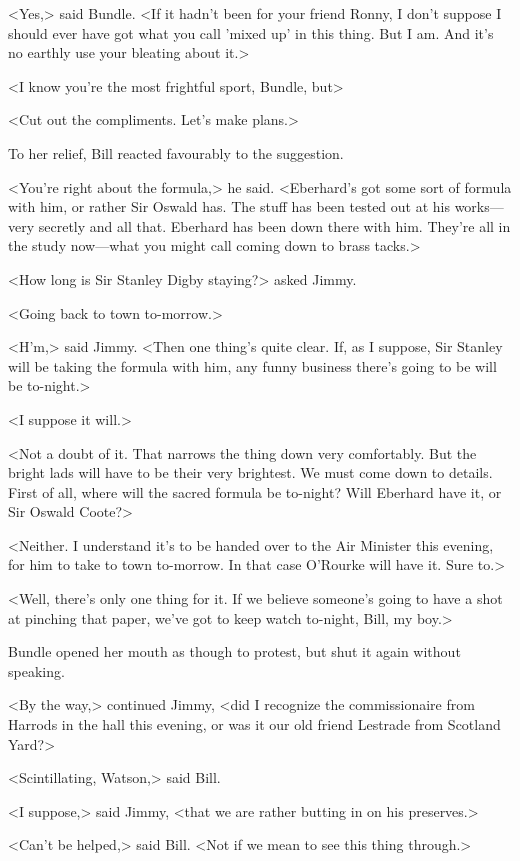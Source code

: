 <Yes,> said Bundle. <If it hadn't been for your friend Ronny, I don't suppose I should ever have got what you call 'mixed up' in this thing. But I am. And it's no earthly use your bleating about it.>

<I know you're the most frightful sport, Bundle, but\longdash>

<Cut out the compliments. Let's make plans.>

To her relief, Bill reacted favourably to the suggestion.

<You're right about the formula,> he said. <Eberhard's got some sort of formula with him, or rather Sir Oswald has. The stuff has been tested out at his works—very secretly and all that. Eberhard has been down there with him. They're all in the study now—what you might call coming down to brass tacks.>

<How long is Sir Stanley Digby staying?> asked Jimmy.

<Going back to town to-morrow.>

<H'm,> said Jimmy. <Then one thing's quite clear. If, as I suppose, Sir Stanley will be taking the formula with him, any funny business there's going to be will be to-night.>

<I suppose it will.>

<Not a doubt of it. That narrows the thing down very comfortably. But the bright lads will have to be their very brightest. We must come down to details. First of all, where will the sacred formula be to-night? Will Eberhard have it, or Sir Oswald Coote?>

<Neither. I understand it's to be handed over to the Air Minister this evening, for him to take to town to-morrow. In that case O'Rourke will have it. Sure to.>

<Well, there's only one thing for it. If we believe someone's going to have a shot at pinching that paper, we've got to keep watch to-night, Bill, my boy.>

Bundle opened her mouth as though to protest, but shut it again without speaking.

<By the way,> continued Jimmy, <did I recognize the commissionaire from Harrods in the hall this evening, or was it our old friend Lestrade from Scotland Yard?>

<Scintillating, Watson,> said Bill.

<I suppose,> said Jimmy, <that we are rather butting in on his preserves.>

<Can't be helped,> said Bill. <Not if we mean to see this thing through.>

